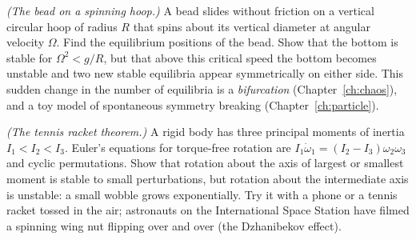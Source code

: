 \begin{problems}
\label{prob:bead-hoop} \emph{(The bead on a spinning hoop.)} A bead slides without friction on a vertical circular hoop of radius $R$ that spins about its vertical diameter at angular velocity $\Omega$. Find the equilibrium positions of the bead. Show that the bottom is stable for $\Omega^2 < g/R$, but that above this critical speed the bottom becomes unstable and two new stable equilibria appear symmetrically on either side. This sudden change in the number of equilibria is a \emph{bifurcation} (Chapter~\ref{ch:chaos}), and a toy model of spontaneous symmetry breaking (Chapter~\ref{ch:particle}).

 \emph{(The tennis racket theorem.)} A rigid body has three principal moments of inertia $I_1 < I_2 < I_3$. Euler's equations for torque-free rotation are
$I_1\dot\omega_1 = (I_2 - I_3)\omega_2\omega_3$ and cyclic permutations. Show that rotation about the axis of largest or smallest moment is stable to small perturbations, but rotation about the intermediate axis is unstable: a small wobble grows exponentially. Try it with a phone or a tennis racket tossed in the air; astronauts on the International Space Station have filmed a spinning wing nut flipping over and over (the Dzhanibekov effect).
\end{problems}

\begin{reading}
\end{reading}
